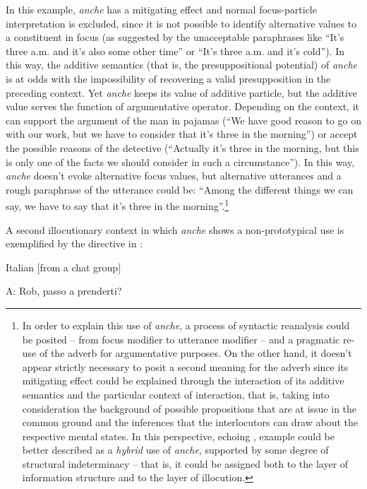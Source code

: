 In this example, \textit{anche} has a mitigating effect and normal focus-particle interpretation is excluded, since it is not possible to identify alternative values to a constituent in focus (as suggested by the unacceptable paraphrases like “It’s three a.m. and it’s also some other time” or “It’s three a.m. and it’s cold”). In this way, the additive semantics (that is, the presuppositional potential) of \textit{anche} is at odds with the impossibility of recovering a valid presupposition in the preceding context. Yet \textit{anche} keeps its value of additive particle, but the additive value serves the function of argumentative operator. Depending on the context, it can support the argument of the man in pajamas (“We have good reason to go on with our work, but we have to consider that it’s three in the morning”) or accept the possible reasons of the detective (“Actually it’s three in the morning, but this is only one of the facts we should consider in such a circumstance”). In this way, \textit{anche} doesn’t evoke alternative focus values, but alternative utterances and a rough paraphrase of the utterance could be: “Among the different things we can say, we have to say that it’s three in the morning”.\footnote{In order to explain this use of \textit{anche}, a process of syntactic reanalysis could be posited – from focus modifier to utterance modifier – and a pragmatic re-use of the adverb for argumentative purposes. On the other hand, it doesn’t appear strictly necessary to posit a second meaning for the adverb since its mitigating effect could be explained through the interaction of its additive semantics and the particular context of interaction, that is, taking into consideration the background of possible propositions that are at issue in the common ground and the inferences that the interlocutors can draw about the respective mental states. In this perspective, echoing \citet[31–33]{Smet2014}, example  could be better described as a \textit{hybrid} use of \textit{anche}, supported by some degree of structural indeterminacy – that is, it could be assigned both to the layer of information structure and to the layer of illocution.}

A second illocutionary context in which \textit{anche} shows a non-prototypical use is exemplified by the directive in :

\ea%
    \label{ex:key:50}

          Italian [from a chat group]

A:  Rob, passo a prenderti?

